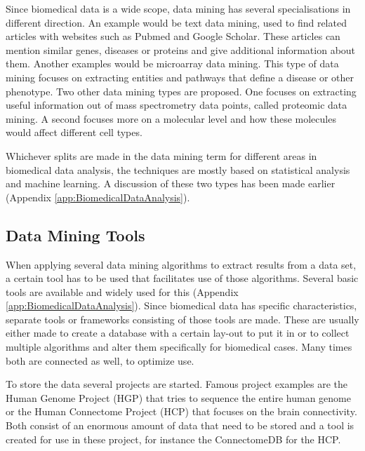 \documentclass[10pt,a4paper]{article}
\begin{document}
	Since biomedical data is a wide scope, data mining has several specialisations in different direction. An example would be text data mining, used to find related articles with websites such as Pubmed and Google Scholar. These articles can mention similar genes, diseases or proteins and give additional information about them. Another examples would be microarray data mining. This type of data mining focuses on extracting entities and pathways that define a disease or other phenotype. Two other data mining types are proposed. One focuses on extracting useful information out of mass spectrometry data points, called proteomic data mining. A second focuses more on a molecular level and how these molecules would affect different cell types.\cite{YANG2012S16}
	
	Whichever splits are made in the data mining term for different areas in biomedical data analysis, the techniques are mostly based on statistical analysis and machine learning. A discussion of these two types has been made earlier (Appendix \ref{app:BiomedicalDataAnalysis}).
	
	\subsection{Data Mining Tools}
	\label{subsec:DataMiningTools}
	
	When applying several data mining algorithms to extract results from a data set, a certain tool has to be used that facilitates use of those algorithms. Several basic tools are available and widely used for this (Appendix \ref{app:BiomedicalDataAnalysis}). Since biomedical data has specific characteristics, separate tools or frameworks consisting of those tools are made. These are usually either made to create a database with a certain lay-out to put it in or to collect multiple algorithms and alter them specifically for biomedical cases. Many times both are connected as well, to optimize use.
	
	To store the data several projects are started. Famous project examples are the Human Genome Project (HGP) that tries to sequence the entire human genome\cite{sawicki1993human} or the Human Connectome Project (HCP) that focuses on the brain connectivity.\cite{van2012human} Both consist of an enormous amount of data that need to be stored and a tool is created for use in these project, for instance the ConnectomeDB for the HCP.\cite{marcus2011informatics}
	
\end{document}
